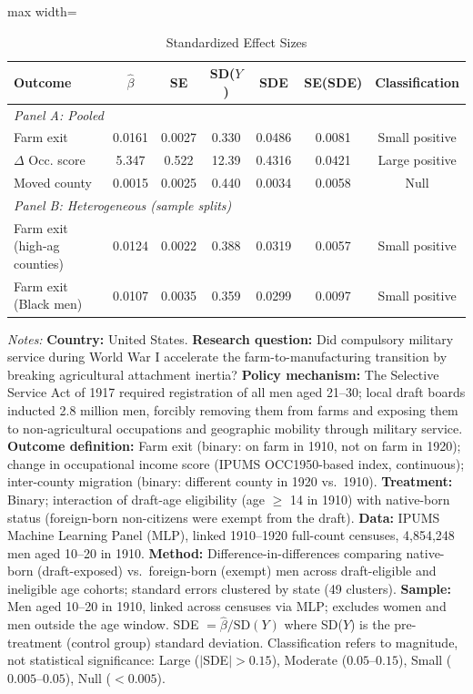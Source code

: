 \begin{table}[t]
\centering
\begin{threeparttable}
\caption{Standardized Effect Sizes}
\label{tab:sde}
\begin{adjustbox}{max width=\textwidth}
\begin{tabular}{lcccccc}
\hline\hline
Outcome & $\hat{\beta}$ & SE & SD($Y$) & SDE & SE(SDE) & Classification \\
\hline
\multicolumn{7}{l}{\textit{Panel A: Pooled}} \\
Farm exit & 0.0161 & 0.0027 & 0.330 & 0.0486 & 0.0081 & Small positive \\
$\Delta$ Occ. score & 5.347 & 0.522 & 12.39 & 0.4316 & 0.0421 & Large positive \\
Moved county & 0.0015 & 0.0025 & 0.440 & 0.0034 & 0.0058 & Null \\
\hline
\multicolumn{7}{l}{\textit{Panel B: Heterogeneous (sample splits)}} \\
Farm exit (high-ag counties) & 0.0124 & 0.0022 & 0.388 & 0.0319 & 0.0057 & Small positive \\
Farm exit (Black men) & 0.0107 & 0.0035 & 0.359 & 0.0299 & 0.0097 & Small positive \\
\hline\hline
\end{tabular}
\end{adjustbox}
\begin{tablenotes}[flushleft]\small
\item \textit{Notes:} \textbf{Country:} United States. \textbf{Research question:} Did compulsory military service during World War I accelerate the farm-to-manufacturing transition by breaking agricultural attachment inertia? \textbf{Policy mechanism:} The Selective Service Act of 1917 required registration of all men aged 21--30; local draft boards inducted 2.8 million men, forcibly removing them from farms and exposing them to non-agricultural occupations and geographic mobility through military service. \textbf{Outcome definition:} Farm exit (binary: on farm in 1910, not on farm in 1920); change in occupational income score (IPUMS OCC1950-based index, continuous); inter-county migration (binary: different county in 1920 vs.\ 1910). \textbf{Treatment:} Binary; interaction of draft-age eligibility (age $\geq$ 14 in 1910) with native-born status (foreign-born non-citizens were exempt from the draft). \textbf{Data:} IPUMS Machine Learning Panel (MLP), linked 1910--1920 full-count censuses, 4,854,248 men aged 10--20 in 1910. \textbf{Method:} Difference-in-differences comparing native-born (draft-exposed) vs.\ foreign-born (exempt) men across draft-eligible and ineligible age cohorts; standard errors clustered by state (49 clusters). \textbf{Sample:} Men aged 10--20 in 1910, linked across censuses via MLP; excludes women and men outside the age window. SDE $= \hat{\beta} / \text{SD}(Y)$ where SD($Y$) is the pre-treatment (control group) standard deviation. Classification refers to magnitude, not statistical significance: Large ($|$SDE$| > 0.15$), Moderate ($0.05$--$0.15$), Small ($0.005$--$0.05$), Null ($< 0.005$).
\end{tablenotes}
\end{threeparttable}
\end{table}

